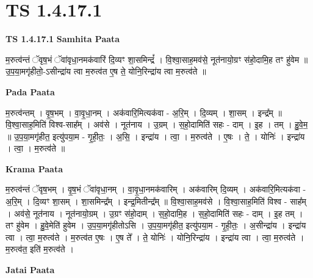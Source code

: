 \documentclass[17pt]{extarticle}
\begin{document}
\section{ TS 1.4.17.1 }

\textbf{TS 1.4.17.1 } \newline
\textbf{Samhita Paata} \newline

म॒रुत्व॑न्तं ॅवृष॒भं ॅवा॑वृधा॒नमक॑वारिं दि॒व्यꣳ शा॒समिन्द्रं᳚ । वि॒श्वा॒साह॒मव॑से॒ नूत॑नायो॒ग्रꣳ स॑हो॒दामि॒ह तꣳ हु॑वेम ॥ उ॒प॒या॒मगृ॑हीतो॒-ऽसीन्द्रा॑य त्वा म॒रुत्व॑त ए॒ष ते॒ योनि॒रिन्द्रा॑य त्वा म॒रुत्व॑ते ॥ \newline

\textbf{Pada Paata} \newline

म॒रुत्व॑न्तम् । वृ॒ष॒भम् । वा॒वृ॒धा॒नम् । अक॑वारि॒मित्यक॑वा - अ॒रि॒म् । दि॒व्यम् । शा॒सम् । इन्द्र᳚म् ॥ वि॒श्वा॒साह॒मिति॑ विश्व-साह᳚म् । अव॑से । नूत॑नाय । उ॒ग्रम् । स॒हो॒दामिति॑ सहः - दाम् । इ॒ह । तम् । हु॒वे॒म॒ ॥ उ॒प॒या॒मगृ॑हीत॒ इत्यु॑पया॒म - गृ॒ही॒तः॒ । अ॒सि॒ । इन्द्रा॑य । त्वा॒ । म॒रुत्व॑ते । ए॒षः । ते॒ । योनिः॑ । इन्द्रा॑य । त्वा॒ । म॒रुत्व॑ते ॥  \newline


\textbf{Krama Paata} \newline

म॒रुत्व॑न्तं ॅवृष॒भम् । वृ॒ष॒भं ॅवा॑वृधा॒नम् । वा॒वृ॒धा॒नमक॑वारिम् । अक॑वारिम् दि॒व्यम् । अक॑वारि॒मित्यक॑वा - अ॒रि॒म् । दि॒व्यꣳ शा॒सम् । शा॒समिन्द्र᳚म् । इन्द्र॒मितीन्द्र᳚म् ॥ वि॒श्वा॒साह॒मव॑से । वि॒श्वा॒साह॒मिति॑ विश्व - साह᳚म् । अव॑से॒ नूत॑नाय । नूत॑नायो॒ग्रम् । उ॒ग्रꣳ स॑हो॒दाम् । स॒हो॒दामि॒ह । स॒हो॒दामिति॑ सहः - दाम् । इ॒ह तम् । तꣳ हु॑वेम । हु॒वे॒मेति॑ हुवेम । उ॒प॒या॒मगृ॑हीतोऽसि । उ॒प॒या॒मगृ॑हीत॒ इत्यु॑पया॒म - गृ॒ही॒तः॒ । अ॒सीन्द्रा॑य । इन्द्रा॑य त्वा । त्वा॒ म॒रुत्व॑ते । म॒रुत्व॑त ए॒षः । ए॒ष ते᳚ । ते॒ योनिः॑ । योनि॒रिन्द्रा॑य । इन्द्रा॑य त्वा । त्वा॒ म॒रुत्व॑ते । म॒रुत्व॑त॒ इति॑ म॒रुत्व॑ते । \newline

\textbf{Jatai Paata} \newline
\end{document}
